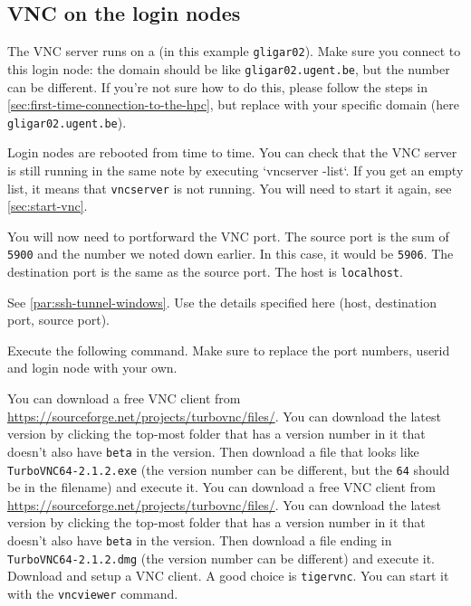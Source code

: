\subsection{VNC on the login nodes}

The VNC server runs on a  (in this example \lstinline|gligar02|).
Make sure you connect to this login node: the domain should be like \lstinline|gligar02.ugent.be|,
but the number can be different. If you're not sure how to do this, please follow the steps
in \autoref{sec:first-time-connection-to-the-hpc}, but replace \loginnode with your specific
domain (here \lstinline|gligar02.ugent.be|).

Login nodes are rebooted from time to time. You can check that the VNC server is still
running in the same note by executing `vncserver -list`. If you get an empty list,
it means that \lstinline|vncserver| is not running. You will need to start it again,
see \autoref{sec:start-vnc}.

You will now need to portforward the VNC port. The source port is the sum of \lstinline|5900|
and the number we noted down earlier. In this case, it would be \lstinline|5906|.
The destination port is the same as the source port. The host is \lstinline|localhost|.

\ifwindows
See \autoref{par:ssh-tunnel-windows}. Use the details specified here (host, destination port,
source port).
\else

Execute the following command. Make sure to replace the port numbers, userid and login node
with your own.

\begin{prompt}
\end{prompt}
\fi

\ifwindows

You can download a free VNC client from \url{https://sourceforge.net/projects/turbovnc/files/}.
You can download the latest version by clicking the top-most folder that has a version number
in it that doesn't also have \lstinline|beta| in the version. Then download a file that looks like
\lstinline|TurboVNC64-2.1.2.exe| (the version number can be different, but the \lstinline|64|
should be in the filename) and execute it.
\fi
\ifmac
You can download a free VNC client from \url{https://sourceforge.net/projects/turbovnc/files/}.
You can download the latest version by clicking the top-most folder that has a version number
in it that doesn't also have \lstinline|beta| in the version. Then download a file ending in
\lstinline|TurboVNC64-2.1.2.dmg| (the version number can be different) and execute it.
\fi
\iflinux
Download and setup a VNC client. A good choice is \lstinline|tigervnc|. You can start
it with the \lstinline|vncviewer| command.
\fi


